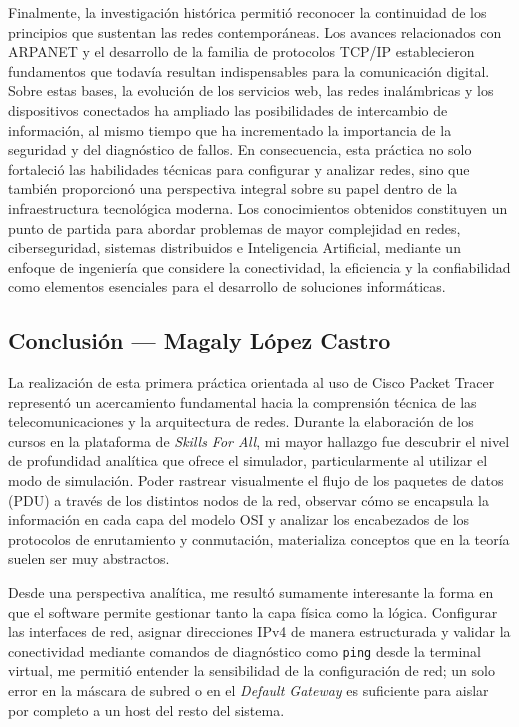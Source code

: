 Finalmente, la investigación histórica permitió reconocer la continuidad de los principios que sustentan las redes contemporáneas. Los avances relacionados con ARPANET y el desarrollo de la familia de protocolos TCP/IP establecieron fundamentos que todavía resultan indispensables para la comunicación digital. Sobre estas bases, la evolución de los servicios web, las redes inalámbricas y los dispositivos conectados ha ampliado las posibilidades de intercambio de información, al mismo tiempo que ha incrementado la importancia de la seguridad y del diagnóstico de fallos. En consecuencia, esta práctica no solo fortaleció las habilidades técnicas para configurar y analizar redes, sino que también proporcionó una perspectiva integral sobre su papel dentro de la infraestructura tecnológica moderna. Los conocimientos obtenidos constituyen un punto de partida para abordar problemas de mayor complejidad en redes, ciberseguridad, sistemas distribuidos e Inteligencia Artificial, mediante un enfoque de ingeniería que considere la conectividad, la eficiencia y la confiabilidad como elementos esenciales para el desarrollo de soluciones informáticas.

\clearpage
\subsection{Conclusión — Magaly López Castro}
\label{sec:prac04:concl:magaly}

La realización de esta primera práctica orientada al uso de Cisco Packet Tracer representó un acercamiento fundamental hacia la comprensión técnica de las telecomunicaciones y la arquitectura de redes. Durante la elaboración de los cursos en la plataforma de \textit{Skills For All}, mi mayor hallazgo fue descubrir el nivel de profundidad analítica que ofrece el simulador, particularmente al utilizar el modo de simulación. Poder rastrear visualmente el flujo de los paquetes de datos (PDU) a través de los distintos nodos de la red, observar cómo se encapsula la información en cada capa del modelo OSI y analizar los encabezados de los protocolos de enrutamiento y conmutación, materializa conceptos que en la teoría suelen ser muy abstractos.

Desde una perspectiva analítica, me resultó sumamente interesante la forma en que el software permite gestionar tanto la capa física como la lógica. Configurar las interfaces de red, asignar direcciones IPv4 de manera estructurada y validar la conectividad mediante comandos de diagnóstico como \texttt{ping} desde la terminal virtual, me permitió entender la sensibilidad de la configuración de red; un solo error en la máscara de subred o en el \textit{Default Gateway} es suficiente para aislar por completo a un host del resto del sistema.


